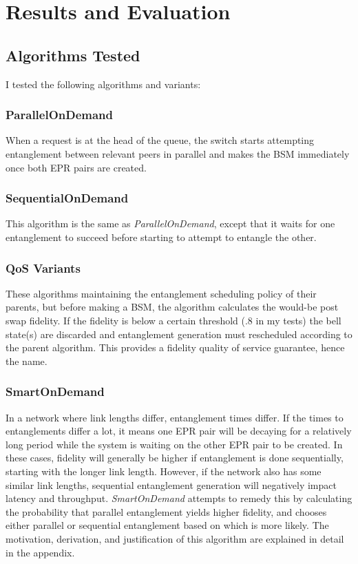\section{Results and Evaluation}
\subsection{Algorithms Tested}
I tested the following algorithms and variants:
\subsubsection{ParallelOnDemand}
When a request is at the head of the queue, the switch starts attempting entanglement between relevant peers in parallel and makes the BSM immediately once both EPR pairs are created.
\subsubsection{SequentialOnDemand}
This algorithm is the same as \textit{ParallelOnDemand}, except that it waits for one entanglement to succeed before starting to attempt to entangle the other.
\subsubsection{QoS Variants}
These algorithms maintaining the entanglement scheduling policy of their parents, but before making a BSM, the algorithm calculates the would-be post swap fidelity.
If the fidelity is below a certain threshold (.8 in my tests) the bell state(s) are discarded and entanglement generation must rescheduled according to the parent algorithm.
This provides a fidelity quality of service guarantee, hence the name.
\subsubsection{SmartOnDemand}
In a network where link lengths differ, entanglement times differ. If the times to entanglements differ a lot, it means one EPR pair will be decaying for a relatively long period while the system is waiting on the other EPR pair to be created.
In these cases, fidelity will generally be higher if entanglement is done sequentially, starting with the longer link length. However, if the network also has some similar link lengths,
sequential entanglement generation will negatively impact latency and throughput. \textit{SmartOnDemand} attempts to remedy this by calculating the probability that parallel entanglement yields higher fidelity,
and chooses either parallel or sequential entanglement based on which is more likely. The motivation, derivation, and justification of this algorithm are explained in detail in the appendix.

